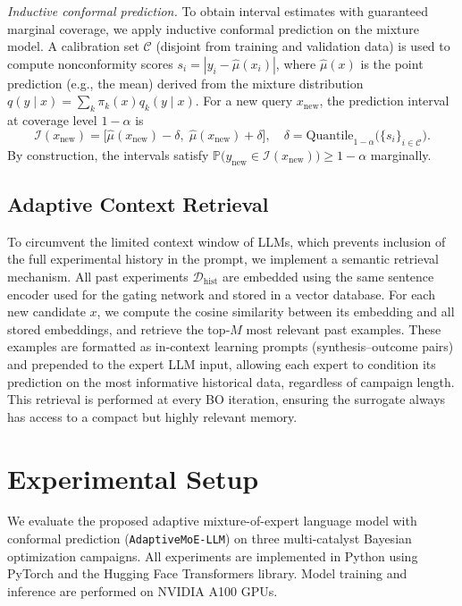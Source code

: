 \documentclass{article}
\begin{document}
\emph{Inductive conformal prediction.} To obtain interval estimates with guaranteed marginal coverage, we apply inductive conformal prediction \cite{angelopoulos2021conformal} on the mixture model. A calibration set \(\mathcal{C}\) (disjoint from training and validation data) is used to compute nonconformity scores \(s_i = |y_i - \hat{\mu}(x_i)|\), where \(\hat{\mu}(x)\) is the point prediction (e.g., the mean) derived from the mixture distribution \(q(y \mid x) = \sum_k \pi_k(x) q_k(y \mid x)\). For a new query \(x_{\text{new}}\), the prediction interval at coverage level \(1 - \alpha\) is
\begin{equation}
\mathcal{I}(x_{\text{new}}) = \bigl[\hat{\mu}(x_{\text{new}}) - \delta,\; \hat{\mu}(x_{\text{new}}) + \delta\bigr],
\quad
\delta = \text{Quantile}_{1-\alpha}\bigl(\{s_i\}_{i\in\mathcal{C}}\bigr).
\end{equation}
By construction, the intervals satisfy \(\mathbb{P}\bigl(y_{\text{new}}\in\mathcal{I}(x_{\text{new}})\bigr) \ge 1-\alpha\) marginally.

\subsection{Adaptive Context Retrieval}

To circumvent the limited context window of LLMs, which prevents inclusion of the full experimental history in the prompt, we implement a semantic retrieval mechanism. All past experiments \(\mathcal{D}_{\text{hist}}\) are embedded using the same sentence encoder used for the gating network and stored in a vector database. For each new candidate \(x\), we compute the cosine similarity between its embedding and all stored embeddings, and retrieve the top‑\(M\) most relevant past examples. These examples are formatted as in‑context learning prompts (synthesis–outcome pairs) and prepended to the expert LLM input, allowing each expert to condition its prediction on the most informative historical data, regardless of campaign length. This retrieval is performed at every BO iteration, ensuring the surrogate always has access to a compact but highly relevant memory.

\section{Experimental Setup}
\label{sec:experimental_setup}

We evaluate the proposed adaptive mixture-of-expert language model with conformal prediction (\texttt{AdaptiveMoE-LLM}) on three multi-catalyst Bayesian optimization campaigns. All experiments are implemented in Python using PyTorch and the Hugging Face Transformers library. Model training and inference are performed on NVIDIA A100 GPUs.
\end{document}
